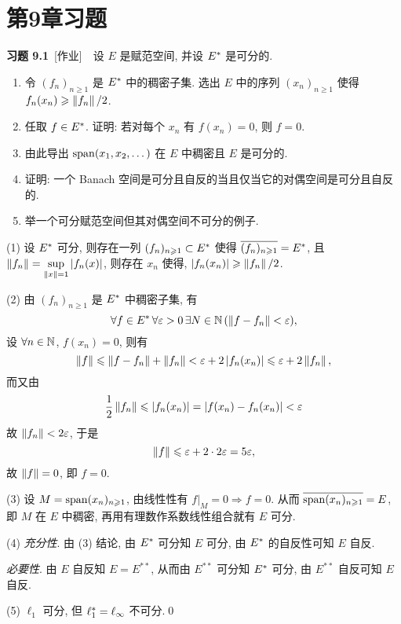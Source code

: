 \section{第9章习题}

	\textbf{习题 9.1}\ [作业]\ \ 设 $ E $ 是赋范空间, 并设 $ E^{*} $ 是可分的.
	\begin{enumerate}[(1)]
		\item 令 $ (f_{n})_{n\geqslant1} $ 是 $ E^{*} $ 中的稠密子集. 选出 $ E $ 中的序列 $ (x_{n})_{n\geqslant1} $ 使得 $ f_{n}(x_{n})\geqslant \left\| f_{n} \right\|/2 $.
		\item 任取 $ f\in E^{*} $. 证明: 若对每个 $ x_{n} $ 有 $ f(x_{n})=0 $, 则 $ f=0 $. 
		\item 由此导出 $ \operatorname{span}(x_{1}, x_{2}, \dots) $ 在 $ E $ 中稠密且 $ E $ 是可分的.
		\item 证明: 一个 Banach 空间是可分且自反的当且仅当它的对偶空间是可分且自反的.
		\item 举一个可分赋范空间但其对偶空间不可分的例子. 
	\end{enumerate}
	\begin{Proof}
		(1) 设 $ E^{*} $ 可分, 则存在一列 $ (f_{n})_{n\geqslant1}\subset E^{*} $ 使得 $ \overline{(f_{n})_{n\geqslant1}}=E^{*} $, 且 $ \left\| f_{n} \right\|=\sup\limits_{\left\| x \right\|=1}\left| f_{n}(x) \right|  $, 则存在 $ x_{n} $ 使得, $ \left| f_{n}(x_{n}) \right| \geqslant\left\| f_{n} \right\|/2 $.

		(2) 由 $ (f_{n})_{n\geqslant1} $ 是 $ E^{*} $ 中稠密子集, 有
		\[
			\forall f\in E^{*}\,\forall \varepsilon>0\,\exists N\in\mathbb{N}\,(\left\| f-f_{n} \right\|<\varepsilon),
		\]
		设 $ \forall n\in\mathbb{N} $, $ f(x_{n})=0 $, 则有
		\[
			\left\| f \right\|\leqslant\left\| f-f_{n} \right\|+\left\| f_{n} \right\|<\varepsilon + 2\left| f_{n}(x_{n}) \right| \leqslant \varepsilon + 2\left\| f_{n} \right\|,
		\]
		而又由
		\[
			\frac{1}{2}\left\| f_{n} \right\|\leqslant\left| f_{n}(x_{n}) \right| =\left| f(x_{n})-f_{n}(x_{n}) \right| <\varepsilon
		\]
		故 $ \left\| f_{n} \right\|<2\varepsilon $, 于是
		\[
			\left\| f \right\|\leqslant\varepsilon+2\cdot 2\varepsilon=5\varepsilon,
		\]
		故 $ \left\| f \right\|=0 $, 即 $ f=0 $.

		(3) 设 $ M=\operatorname{span}(x_{n})_{n\geqslant1} $, 由线性性有 $ f|_{M}=0\Rightarrow f=0 $. 从而 $ \overline{\operatorname{span}(x_{n})_{n\geqslant1}}=E $, 即 $ M $ 在 $ E $ 中稠密, 再用有理数作系数线性组合就有 $ E $ 可分.

		(4) \textsl{充分性}. 由 (3) 结论, 由 $ E^{*} $ 可分知 $ E $ 可分, 由 $ E^{*} $ 的自反性可知 $ E $ 自反.

		\textsl{必要性}. 由 $ E $ 自反知 $ E=E^{**} $, 从而由 $ E^{**} $ 可分知 $ E^{*} $ 可分, 由 $ E^{**} $ 自反可知 $ E $ 自反.

		(5) $ \ell_{1} $ 可分, 但 $ \ell_{1}^{*}=\ell_{\infty} $ 不可分.\qed
	\end{Proof}
	
